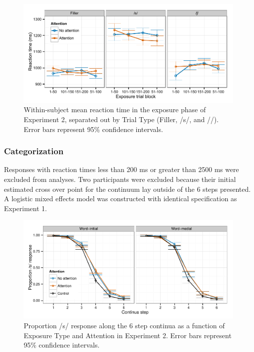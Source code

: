 
\begin{figure}[!ht]
\caption{Within-subject mean reaction time in the exposure phase of Experiment 2, separated out by Trial Type (Filler, /s/, and /\textesh/). Error bars represent 95\% confidence intervals.}
\label{fig:exp2exposert}
\begin{center}
\includegraphics[width=\textwidth]{graphs/exp2_exprt}
\end{center}
\end{figure}

\subsubsection{Categorization}

Responses with reaction times less than 200 ms or greater than 2500 ms were excluded from analyses. 
Two participants were excluded because their initial estimated cross over point for the continuum lay outside of the 6 steps presented.  
A logistic mixed effects model was constructed with identical specification as Experiment 1.

\begin{figure}[!ht]
\caption{Proportion /s/ response along the 6 step continua as a function of Exposure Type and Attention in Experiment 2. Error bars represent 95\% confidence intervals.}
\label{fig:exp2categ}
\begin{center}
\includegraphics[width=\textwidth]{graphs/exp2_categresults}
\end{center}
\end{figure}

